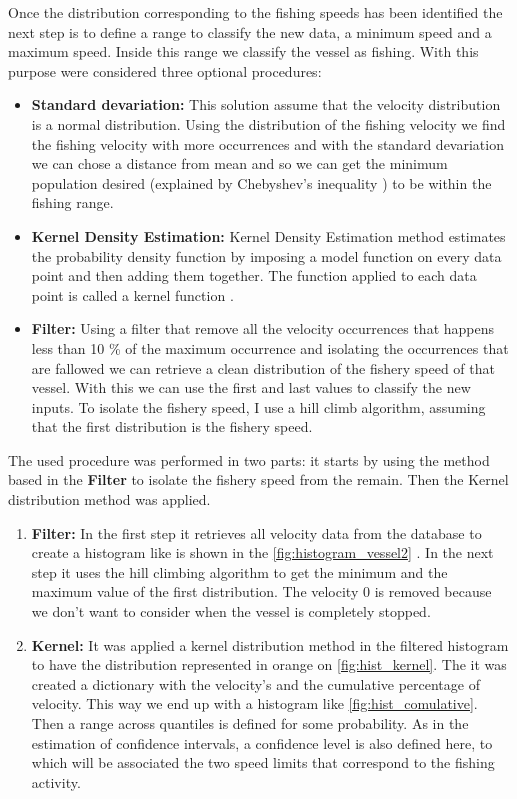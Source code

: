 Once the distribution corresponding to the fishing speeds has been identified the next step is to define a range to classify the new data, a minimum speed and a maximum speed.
Inside this range we classify the vessel as fishing. With this purpose were considered three optional procedures:
\begin{itemize}
\item	\textbf{Standard devariation:}
This solution assume that the velocity distribution is a normal distribution.   Using the distribution of the fishing velocity we find the fishing velocity with more occurrences and with the standard devariation we can chose a distance from mean and so we can get the minimum population desired (explained by Chebyshev’s inequality \cite{Chebyshevinequality}) to be within the fishing range. 

\item	\textbf{Kernel Density Estimation:}
Kernel Density Estimation method estimates the probability density function by imposing a model function on every data point and then adding them together. The function applied to each data point is called a kernel function \cite{KernelDensityEstimation}.

\item	\textbf{Filter:}
Using a filter that remove all the velocity occurrences that happens less than 10 \% of the maximum occurrence and isolating the occurrences that are fallowed we can retrieve a clean distribution of the fishery speed of that vessel.  With this we can use the first and last values to classify the new inputs. To isolate the fishery speed, I use a hill climb algorithm, assuming that the first distribution is the fishery speed.
\end{itemize}

The used procedure was performed in two parts:  it starts by using the method based in the \textbf{Filter} to isolate the fishery speed from the remain. Then the Kernel distribution method was applied.
\begin{enumerate}


\item	\textbf{Filter:} In the first step it retrieves all velocity data from the database to create a histogram like is shown in the \ref{fig:histogram_vessel2} . In the next step it uses the hill climbing algorithm to get the minimum and the maximum value of the first distribution. The velocity 0 is removed because we don’t want to consider when the vessel is completely stopped. 
\item	\textbf{Kernel:} It was applied a kernel distribution method in the filtered histogram to have the distribution represented in orange on \ref{fig:hist_kernel}. The it was created a dictionary with the velocity’s and the cumulative percentage of velocity. This way we end up with a histogram like \ref{fig:hist_comulative}.  
Then a range across quantiles is defined for some probability. As in the estimation of confidence intervals, a confidence level is also defined here, to which will be associated the two speed limits that correspond to the fishing activity.
\end{enumerate}  

